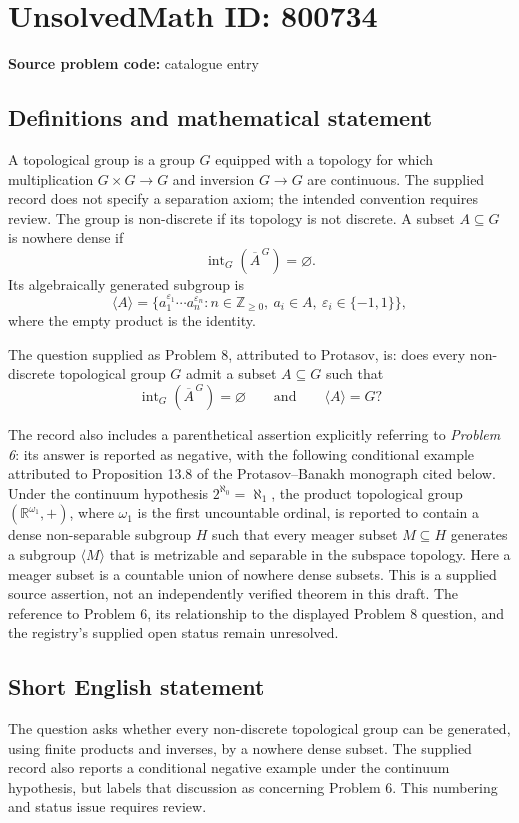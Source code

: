 \documentclass[11pt]{article}
\newcommand{\Z}{\mathbb{Z}}
\newcommand{\R}{\mathbb{R}}
\begin{document}
\section*{UnsolvedMath ID: 800734}
\textbf{Source problem code:} catalogue entry
\subsection{Definitions and mathematical statement}
A topological group is a group \(G\) equipped with a topology for which multiplication \(G\times G\to G\) and inversion \(G\to G\) are continuous. The supplied record does not specify a separation axiom; the intended convention requires review. The group is non-discrete if its topology is not discrete. A subset \(A\subseteq G\) is nowhere dense if
\[
\operatorname{int}_G\!\left(\overline{A}^{\,G}\right)=\varnothing.
\]
Its algebraically generated subgroup is
\[
\langle A\rangle
=\{a_1^{\varepsilon_1}\cdots a_n^{\varepsilon_n}: n\in\Z_{\geq 0},\ a_i\in A,\ \varepsilon_i\in\{-1,1\}\},
\]
where the empty product is the identity.

The question supplied as Problem 8, attributed to Protasov, is: does every non-discrete topological group \(G\) admit a subset \(A\subseteq G\) such that
\[
\operatorname{int}_G\!\left(\overline{A}^{\,G}\right)=\varnothing
\qquad\text{and}\qquad
\langle A\rangle=G?
\]

The record also includes a parenthetical assertion explicitly referring to \emph{Problem 6}: its answer is reported as negative, with the following conditional example attributed to Proposition 13.8 of the Protasov--Banakh monograph cited below. Under the continuum hypothesis \(2^{\aleph_0}=\aleph_1\), the product topological group \((\R^{\omega_1},+)\), where \(\omega_1\) is the first uncountable ordinal, is reported to contain a dense non-separable subgroup \(H\) such that every meager subset \(M\subseteq H\) generates a subgroup \(\langle M\rangle\) that is metrizable and separable in the subspace topology. Here a meager subset is a countable union of nowhere dense subsets. This is a supplied source assertion, not an independently verified theorem in this draft. The reference to Problem 6, its relationship to the displayed Problem 8 question, and the registry's supplied open status remain unresolved.
\subsection{Short English statement}
The question asks whether every non-discrete topological group can be generated, using finite products and inverses, by a nowhere dense subset. The supplied record also reports a conditional negative example under the continuum hypothesis, but labels that discussion as concerning Problem 6. This numbering and status issue requires review.
\end{document}
